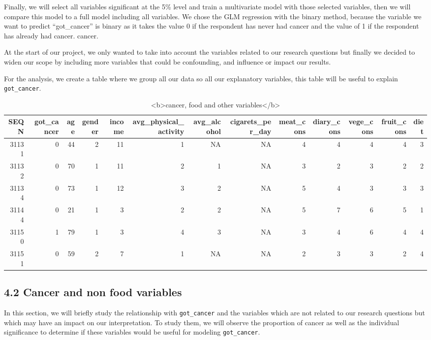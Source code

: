 \documentclass[
]{article}
\begin{document}
Finally, we will select all variables significant at the 5\% level and
train a multivariate model with those selected variables, then we will
compare this model to a full model including all variables. We chose the
GLM regression with the binary method, because the variable we want to
predict ``got\_cancer'' is binary as it takes the value 0 if the
respondent has never had cancer and the value of 1 if the respondent has
already had cancer. cancer.

At the start of our project, we only wanted to take into account the
variables related to our research questions but finally we decided to
widen our scope by including more variables that could be confounding,
and influence or impact our results.

For the analysis, we create a table where we group all our data so all
our explanatory variables, this table will be useful to explain
\texttt{got\_cancer}.

\begin{table}

\caption{\label{tab:unnamed-chunk-92}<b>cancer, food and other variables</b>}
\centering
\begin{tabular}[t]{r|r|r|r|r|r|r|r|r|r|r|r|r}
\hline
SEQN & got\_cancer & age & gender & income & avg\_physical\_activity & avg\_alcohol & cigarets\_per\_day & meat\_cons & diary\_cons & vege\_cons & fruit\_cons & diet\\
\hline
31131 & 0 & 44 & 2 & 11 & 1 & NA & NA & 4 & 4 & 4 & 4 & 3\\
\hline
31132 & 0 & 70 & 1 & 11 & 2 & 1 & NA & 3 & 2 & 3 & 2 & 2\\
\hline
31134 & 0 & 73 & 1 & 12 & 3 & 2 & NA & 5 & 4 & 3 & 3 & 3\\
\hline
31144 & 0 & 21 & 1 & 3 & 2 & 2 & NA & 5 & 7 & 6 & 5 & 1\\
\hline
31150 & 1 & 79 & 1 & 3 & 4 & 3 & NA & 3 & 4 & 6 & 4 & 4\\
\hline
31151 & 0 & 59 & 2 & 7 & 1 & NA & NA & 2 & 3 & 3 & 2 & 4\\
\hline
\end{tabular}
\end{table}

\hypertarget{cancer-and-non-food-variables}{%
\subsection{4.2 Cancer and non food
variables}\label{cancer-and-non-food-variables}}

In this section, we will briefly study the relationship with
\texttt{got\_cancer} and the variables which are not related to our
research questions but which may have an impact on our interpretation.
To study them, we will observe the proportion of cancer as well as the
individual significance to determine if these variables would be useful
for modeling \texttt{got\_cancer}.
\end{document}

